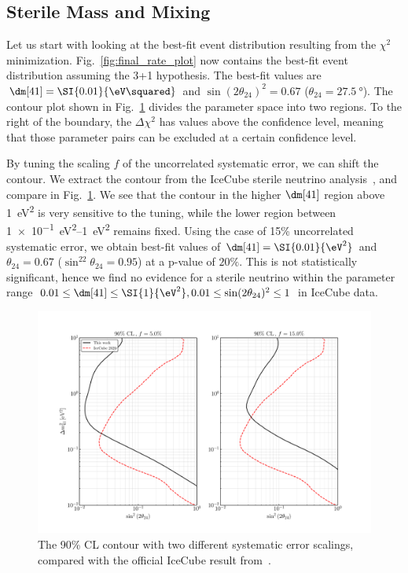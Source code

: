 \subsection{Sterile Mass and Mixing}
Let us start with looking at the best-fit event distribution resulting from the $\chi^2$ minimization.
Fig.~\ref{fig:final_rate_plot} now contains the best-fit event distribution assuming the 3+1 hypothesis.
The best-fit values are $\dm[41] = \SI{0.01}{\eV\squared}$ and 
$\sin(2\theta_{24})^2 = 0.67$ ($\theta_{24} = \SI{27.5}{\degree}$). 
The contour plot shown in Fig.~\ref{fig:error_tuning} divides the parameter space into two regions.
To the right of the boundary, the $\Delta \chi^2$ has values above the confidence level, meaning that 
those parameter pairs can be excluded at a certain confidence level.

By tuning the scaling $f$ of the uncorrelated systematic error, we can shift the contour. We extract the contour from the 
IceCube sterile neutrino analysis~\cite{IC2020}, and compare in Fig.~\ref{fig:error_tuning}. We see that the contour in the 
higher $\dm[41]$ region above \SI{1}{\eV\squared} is very sensitive to the tuning, while the lower region between \SIrange[]{1e-1}{1}{\eV\squared}
remains fixed. Using the case of 15\% uncorrelated systematic error, we obtain best-fit values of $\dm[41] = \SI{0.01}{\eV^2}$ and $\theta_{24} = 0.67$ ($\sin^22\theta_{24} = 0.95$) at 
a p-value of $20\%$. This is not statistically significant, 
hence we find no evidence for a sterile neutrino within the parameter range $0.01 \le \dm[41] \le \SI{1}{\eV^2}, 0.01\le \sin(2\theta_{24})^2 \le 1$  in IceCube data.
\begin{figure}
    \centering
    \includegraphics[scale=0.58]{figures/s24_error_tuning.pdf}
    \caption{The 90\% CL contour with two different systematic error scalings, compared 
    with the official IceCube result from~\cite{IC2020}.}\label{fig:error_tuning}
\end{figure}


